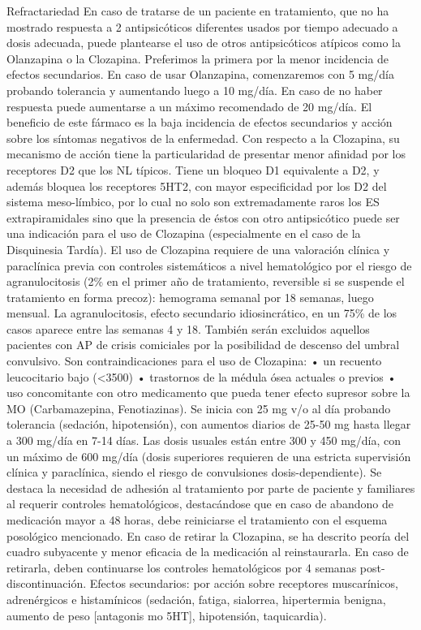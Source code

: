  Refractariedad En caso de tratarse de un paciente en tratamiento, que no ha mostrado respuesta a 2 antipsicóticos diferentes usados por tiempo adecuado a dosis adecuada, puede plantearse el uso de otros antipsicóticos atípicos como la Olanzapina o la Clozapina. Preferimos la primera por la menor incidencia de efectos secundarios. En caso de usar Olanzapina, comenzaremos con 5 mg/día probando tolerancia y aumentando luego a 10 mg/día. En caso de no haber respuesta puede aumentarse a un máximo recomendado de 20 mg/día. El beneficio de este fármaco es la baja incidencia de efectos secundarios y acción sobre los síntomas negativos de la enfermedad. Con respecto a la Clozapina, su mecanismo de acción tiene la particularidad de presentar menor afinidad por los receptores D2 que los NL típicos. Tiene un bloqueo D1 equivalente a D2, y además bloquea los receptores 5HT2, con mayor especificidad por los D2 del sistema meso-límbico, por lo cual no solo son extremadamente raros los ES extrapiramidales sino que la presencia de éstos con otro antipsicótico puede ser una indicación para el uso de Clozapina (especialmente en el caso de la Disquinesia Tardía). El uso de Clozapina requiere de una valoración clínica y paraclínica previa con controles sistemáticos a nivel hematológico por el riesgo de agranulocitosis (2\% en el primer año de tratamiento, reversible si se suspende el tratamiento en forma precoz): hemograma semanal por 18 semanas, luego mensual. La agranulocitosis, efecto secundario idiosincrático, en un 75\% de los casos aparece entre las semanas 4 y 18. También serán excluidos aquellos pacientes con AP de crisis comiciales por la posibilidad de descenso del umbral convulsivo. Son contraindicaciones para el uso de Clozapina: • un recuento leucocitario bajo (<3500) • trastornos de la médula ósea actuales o previos • uso concomitante con otro medicamento que pueda tener efecto supresor sobre la MO (Carbamazepina, Fenotiazinas). Se inicia con 25 mg v/o al día probando tolerancia (sedación, hipotensión), con aumentos diarios de 25-50 mg hasta llegar a 300 mg/día en 7-14 días. Las dosis usuales están entre 300 y 450 mg/día, con un máximo de 600 mg/día (dosis superiores requieren de una estricta supervisión clínica y paraclínica, siendo el riesgo de convulsiones dosis-dependiente). Se destaca la necesidad de adhesión al tratamiento por parte de paciente y familiares al requerir controles hematológicos, destacándose que en caso de abandono de medicación mayor a 48 horas, debe reiniciarse el tratamiento con el esquema posológico mencionado. En caso de retirar la Clozapina, se ha descrito peoría del cuadro subyacente y menor eficacia de la medicación al reinstaurarla. En caso de retirarla, deben continuarse los controles hematológicos por 4 semanas post-discontinuación. Efectos secundarios: por acción sobre receptores muscarínicos, adrenérgicos e histamínicos (sedación, fatiga, sialorrea, hipertermia benigna, aumento de peso [antagonis mo 5HT], hipotensión, taquicardia).

